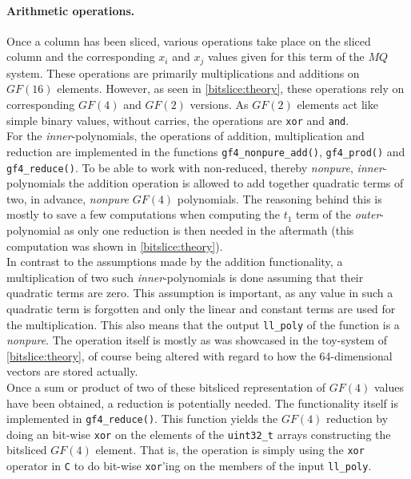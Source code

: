 \paragraph{Arithmetic operations.} 
Once a column has been sliced, various operations take place on the sliced column and the corresponding $x_i$ and $x_j$ values given for this term of the $MQ$ system. These operations are primarily multiplications and additions on $GF(16)$ elements. However, as seen in \cref{bitslice:theory}, these operations rely on corresponding $GF(4)$ and $GF(2)$ versions. As $GF(2)$ elements act like simple binary values, without carries, the operations are \texttt{xor} and \texttt{and}. 
\medskip\\
For the \emph{inner}-polynomials, the operations of addition, multiplication and reduction are implemented in the functions \texttt{gf4\_nonpure\_add()}, \texttt{gf4\_prod()} and \texttt{gf4\_reduce()}. To be able to work with non-reduced, thereby \emph{nonpure}, \emph{inner}-polynomials the addition operation is allowed to add together quadratic terms of two, in advance, \emph{nonpure} $GF(4)$ polynomials. The reasoning behind this is mostly to save a few computations when computing the $t_1$ term of the \emph{outer}-polynomial as only one reduction is then needed in the aftermath (this computation was shown in \cref{bitslice:theory}).
\medskip\\
In contrast to the assumptions made by the addition functionality, a multiplication of two such \emph{inner}-polynomials is done assuming that their quadratic terms are zero. This assumption is important, as any value in such a quadratic term is forgotten and only the linear and constant terms are used for the multiplication. This also means that the output \texttt{ll\_poly} of the function is a \emph{nonpure}. The operation itself is mostly as was showcased in the toy-system of \cref{bitslice:theory}, of course being altered with regard to how the 64-dimensional vectors are stored actually.
\medskip\\
Once a sum or product of two of these bitsliced representation of $GF(4)$ values have been obtained, a reduction is potentially needed. The functionality itself is implemented in \texttt{gf4\_reduce()}. This function yields the $GF(4)$ reduction by doing an bit-wise \texttt{xor} on the elements of the \texttt{uint32\_t} arrays constructing the bitsliced $GF(4)$ element. That is, the operation is simply using the \texttt{xor} operator in \texttt{C} to do bit-wise \texttt{xor}'ing on the members of the input \texttt{ll\_poly}.
